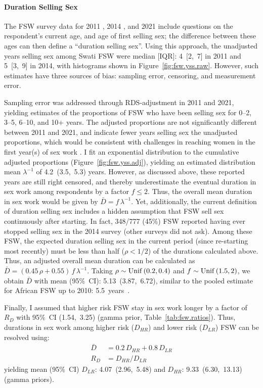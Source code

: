 \paragraph{Duration Selling Sex}
The FSW survey data for 2011 \cite{Baral2014}, 2014 \cite{EswKP2014}, and 2021 \cite{EswIBBS2022}
include questions on the respondent's current age, and age of first selling sex;
the difference between these ages can then define a ``duration selling sex''.
Using this approach, the unadjusted years selling sex among Swati FSW were
median [IQR]: 4~[2,~7] in 2011 and 5~[3,~9] in 2014,
with histograms shown in Figure~\ref{fig:fsw.yss.raw}.
However, such estimates have three sources of bias:
sampling error, censoring, and measurement error.
\par
Sampling error was addressed through RDS-adjustment in 2011 and 2021,
yielding estimates of the proportions of FSW
who have been selling sex for 0--2, 3--5, 6--10, and 10+ years.
The adjusted proportions are not significantly different between 2011 and 2021, and
indicate fewer years selling sex \vs the unadjusted proportions, which would be consistent with
challenges in reaching women in the first year(s) of sex work \cite{Cheuk2020}.
I fit an exponential distribution to the cumulative adjusted proportions
(Figure~\ref{fig:fsw.yss.adj}), yielding an estimated distribution mean
${\lambda}^{-1}$ of 4.2~(3.5,~5.3) years.
However, as discussed above, these reported years are still right censored, and
thereby underestimate the eventual duration in sex work among respondents by a factor $f \le 2$.
Thus, the overall mean duration in sex work would be given by $\bar{D} = f\,\lambda^{-1}$.
Yet, additionally, the current definition of duration selling sex
includes a hidden assumption that FSW sell sex continuously after starting.
In fact, 348/777 (45\%) FSW reported having ever stopped selling sex
in the 2014 survey \cite{EswKP2014} (other surveys did not ask).
Among these FSW, the expected duration selling sex in the current period
(\ie since re-starting most recently)
must be less than half ($\rho < 1/2$) of the durations calculated above.
Thus, an adjusted overall mean duration can be calculated as
$\bar{D} = (0.45\,\rho + 0.55)\,f\,\lambda^{-1}$.
Taking $\rho \sim \operatorname{Unif}\,(0.2,0.4)$ and $f \sim \operatorname{Unif}\,(1.5,2)$,
we obtain $\bar{D}$ with mean (95\%~CI): 5.13~(3.87,~6.72),
similar to the pooled estimate for African FSW up to 2010: 5.5~years~\cite{Fazito2012}.
\par
Finally, I assumed that higher risk FSW stay in sex work longer by a factor of
$R_{D}$ with 95\%~CI (1.54,~3.25) (gamma prior, Table~\ref{tab:fsw.ratios}).
Thus, durations in sex work among higher risk ($D_{HR}$) and lower risk ($D_{LR}$) FSW
can be resolved using:
\begin{equation}
  \begin{aligned}
    \bar{D} &= 0.2\,D_{HR} + 0.8\,D_{LR} \\
    R_{D} &= D_{HR} / D_{LR}
  \end{aligned}
\end{equation}
yielding mean (95\%~CI) $D_{LR}$: 4.07~(2.96,~5.48) and $D_{HR}$: 9.33~(6.30,~13.13) (gamma priors).

